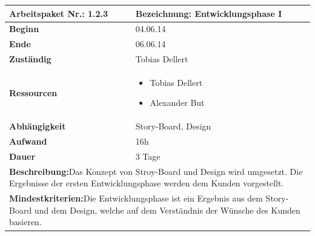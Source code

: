 \documentclass[fontsize=12pt,paper=a4,twoside]{scrartcl}
\begin{document}
\begin{tabular}{|p{5.3cm}|p{9.7cm}|}\hline
	\textbf{Arbeitspaket Nr.:} 1.2.3 & \textbf{Bezeichnung:} Entwicklungsphase I \\ \hline \hline
	\textbf{Beginn} & 04.06.14\\ \hline
	\textbf{Ende} & 06.06.14\\ \hline
	\textbf{Zuständig} & Tobias Dellert \\ \hline
	\textbf{Ressourcen} & \begin{itemize}
		\item Tobias Dellert
		\item Alexander But
	\end{itemize}    \\ \hline
	\textbf{Abhängigkeit} & Story-Board, Design\\ \hline
	\textbf{Aufwand} & 16h\\ \hline
	\textbf{Dauer} & 3 Tage\\ \hline
	\multicolumn{2}{|p{15cm}|}{\textbf{Beschreibung:}\newline Das Konzept von Stroy-Board und Design wird umgesetzt. Die Ergebnisse der ersten Entwicklungsphase werden dem Kunden vorgestellt.  }\\ \hline
	\multicolumn{2}{|p{15cm}|}{\textbf{Mindestkriterien:}\newline Die Entwicklungsphase ist ein Ergebnis aus dem Story-Board und dem Design, welche auf dem Verständnis der Wünsche des Kunden basieren.}\\ \hline
	
\end{tabular}
\begin{verbatim} 

\end{verbatim}
\end{document}
